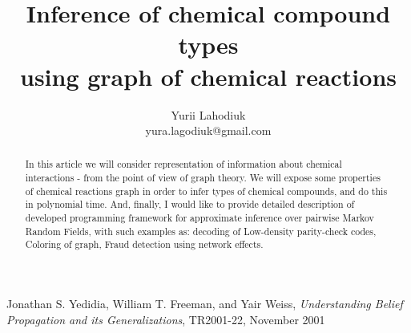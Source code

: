 \documentclass{article}
\begin{document}
\title{Inference of chemical compound types \\ using graph of chemical reactions}
\author{Yurii Lahodiuk \\ yura.lagodiuk@gmail.com}
\date{}
\maketitle

\begin{abstract}
In this article we will consider representation of information about chemical interactions - from the point of view of graph theory. We will expose some properties of chemical reactions graph in order to infer types of chemical compounds, and do this in polynomial time. And, finally, I would like to provide detailed description of developed programming framework for approximate inference over pairwise Markov Random Fields, with such examples as: decoding of Low-density parity-check codes, Coloring of graph, Fraud detection using network effects.
\end{abstract}

\begin{thebibliography}{9}

  Jonathan S. Yedidia, William T. Freeman, and Yair Weiss,
  \emph{Understanding Belief Propagation and its Generalizations},
  TR2001-22, 
  November 2001

\end{thebibliography}
\end{document}
